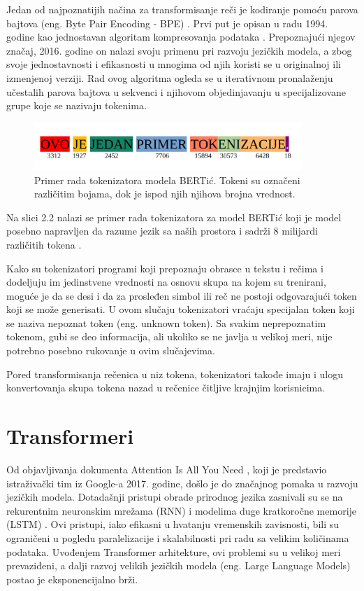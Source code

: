 \documentclass[12pt,oneside]{memoir}
\begin{document}
Jedan od najpoznatijih načina za transformisanje reči je kodiranje pomoću parova bajtova (eng. Byte Pair Encoding - BPE) \cite{BPETokenization}. Prvi put je opisan u radu 1994. godine kao jednostavan algoritam kompresovanja podataka \cite{BPEDataCompression}. Prepoznajući njegov značaj, 2016. godine on nalazi svoju primenu pri razvoju jezičkih modela, a zbog svoje jednostavnosti i efikasnosti u mnogima od njih koristi se u originalnoj ili izmenjenoj verziji. Rad ovog algoritma ogleda se u iterativnom pronalaženju učestalih parova bajtova u sekvenci i njihovom objedinjavanju u specijalizovane grupe koje se nazivaju tokenima.

\begin{figure}[!ht]
	\centering
	\label{fig:TokenizationExample}
	\includegraphics[width=0.9\textwidth]{Tokenization_example.png}
	\caption{Primer rada tokenizatora modela BERTić. Tokeni su označeni različitim bojama, dok je ispod njih njihova brojna vrednost.}
\end{figure}

Na slici 2.2 nalazi se primer rada tokenizatora za model BERTić koji je model posebno napravljen da razume jezik sa naših prostora i sadrži 8 milijardi različitih tokena \cite{BERTic}. 


Kako su tokenizatori programi koji prepoznaju obrasce u tekstu i rečima i dodeljuju im jedinstvene vrednosti na osnovu skupa na kojem su trenirani, moguće je da se desi i da za prosleđen simbol ili reč ne postoji odgovarajući token koji se može generisati. U ovom slučaju tokenizatori vraćaju 
specijalan token koji se naziva nepoznat token (eng. unknown token). Sa svakim neprepoznatim tokenom, gubi se deo informacija, ali ukoliko se ne javlja u velikoj meri, nije potrebno posebno rukovanje u ovim slučajevima.

Pored transformisanja rečenica u niz tokena, tokenizatori takođe imaju i ulogu konvertovanja skupa tokena nazad u rečenice čitljive krajnjim korisnicima.


\section{Transformeri}

Od objavljivanja dokumenta Attention Is All You Need \cite{AttentionIsAllYouNeed}, koji je predstavio istraživački tim iz Google-a 2017. godine, došlo je do značajnog pomaka u razvoju jezičkih modela. Dotadašnji pristupi obrade prirodnog jezika zasnivali su se na rekurentnim neuronskim mrežama (RNN) i modelima duge kratkoročne memorije (LSTM) \cite{RNNAndLSTM}. Ovi pristupi, iako efikasni u hvatanju vremenskih zavisnosti, bili su ograničeni u pogledu paralelizacije i skalabilnosti pri radu sa velikim količinama podataka. Uvođenjem Transformer arhitekture, ovi problemi su u velikoj meri prevaziđeni, a dalji razvoj velikih jezičkih modela (eng. Large Language Models) postao je eksponencijalno brži.
\end{document}
